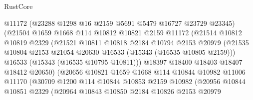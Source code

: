 \begin{lexlean}{RustCore}
\begin{coremodule}
                            @11172
                            (@23288 @1298 @16 @2159 @5691 @5479 @16727 @23729 @23345)
                            (@21504
                              @1659
                              @1668
                              @114
                              @10812
                              @10821
                              @2159
                              @11172
                              (@21514
                                @10812
                                @10819
                                @2329
                                (@21521
                                  @10811
                                  @10818
                                  @2184
                                  @10794
                                  @2153
                                  @20979
                                  (@21535
                                    @10804
                                    @2153
                                    @21054
                                    @20630
                                    @16533
                                    (@15343 (@16535 @10805 @2159)))
                                  @16533
                                  (@15343 (@16535 @10795 @10811)))
                                @18397
                                @18400
                                @18403
                                @18407
                                @18412
                                @20650)
                              (@20656
                                @10821
                                @1659
                                @1668
                                @114
                                @10844
                                @10982
                                @11006
                                @11170
                                (@30709
                                  @1200
                                  @114
                                  @10844
                                  @10853
                                  @2159
                                  @10982
                                  (@20956
                                    @10844
                                    @10851
                                    @2329
                                    (@20964
                                      @10843
                                      @10850
                                      @2184
                                      @10826
                                      @2153
                                      @20979

\end{coremodule}
\end{lexlean}
